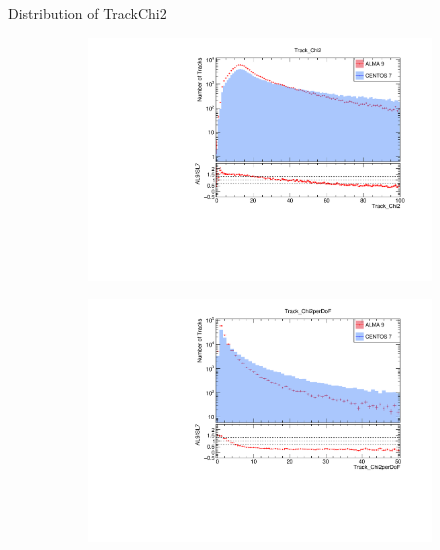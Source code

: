 
\begin{frame}{Distribution of TrackChi2}
    \begin{figure}
        \begin{subfigure}{0.49\linewidth}
            \includegraphics[width=\linewidth]{./output/Track_Chi2.pdf}
        \end{subfigure}
        \begin{subfigure}{0.49\linewidth}
            \includegraphics[width=\linewidth]{./output/Track_Chi2perDoF.pdf}

\end{subfigure}
\end{figure}
\end{frame}
